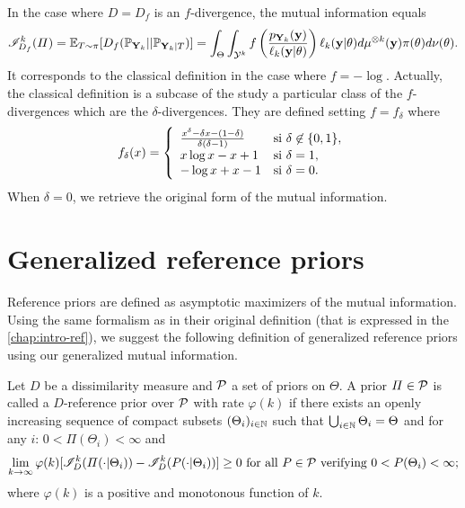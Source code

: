 In the case where $D=D_f$ is an $f$-divergence, the mutual information equals
    \begin{equation}
        \mathscr{I}_{D_f}^k(\varPi) =\mathbb{E}_{T\sim\pi}[D_f(\mathbb{P}_{\mathbf{Y}_k}||\mathbb{P}_{\mathbf{Y}_k|T})] = \int_\Theta\int_{\mathcal{Y}^k}f\left( \frac{p_{\mathbf{Y}_k}(\mathbf{y})}{\ell_k(\mathbf{y}|\theta)} \right) \ell_k(\mathbf{y}|\theta)d\mu^{\otimes k}(\mathbf{y}) \pi(\theta)d\nu(\theta).
    \end{equation}
It corresponds to  the classical definition in the case where $f=-\log$. Actually, the classical definition is a subcase of the study a particular class of the $f$-divergences which are the $\delta$-divergences. They are defined setting $f=f_\delta$ where 
\begin{equation}
    f_\delta(x) = \left\lbrace\begin{array}{l l} \frac{x^\delta-\delta x-(1-\delta)}{\delta(\delta-1)} & \text{si\ }\delta\not\in\{0,1\},\\ 
        x\log x-x+1  & \text{si\ }\delta=1, \\
        -\log x +x -1 & \text{si\ }\delta=0.
    \end{array}\right. 
\end{equation}    
When $\delta=0$, we retrieve the original form of the mutual information.


\section{Generalized reference priors}


Reference priors are defined as asymptotic maximizers of the mutual information. Using the same formalism as in their original definition (that is expressed in the \cref{chap:intro-ref}), we suggest the following definition of generalized reference priors using our generalized mutual information.

\begin{defi}\label{def:genref}
    Let $D$ be a dissimilarity measure and $\mathcal{P}$ a set of priors on $\Theta$. A prior $\varPi\in\mathcal{P}$ is called a $D$-reference prior over $\mathcal{P}$ with rate $\varphi(k)$ if there exists an openly increasing  sequence of compact subsets $(\Theta_i)_{i\in\mathbb{N}}$
    such that $\bigcup_{i\in\mathbb{N}}\Theta_i=\Theta$ and for any $i$: $0<\varPi(\Theta_i)<\infty $ and
        \begin{equation}\label{eq:defrefpriorsi}
            \lim_{k\rightarrow\infty}\varphi(k)[\sI^k_D(\varPi(\cdot|\Theta_i))-\sI^k_D(P(\cdot|\Theta_i))] \geq0 \text{\ for all\ } P\in\cP\text{\ verifying\ }0<P(\Theta_i)<\infty;
        \end{equation}
    where  $\varphi(k)$ is a {positive and}  monotonous function of $k$.
\end{defi}


